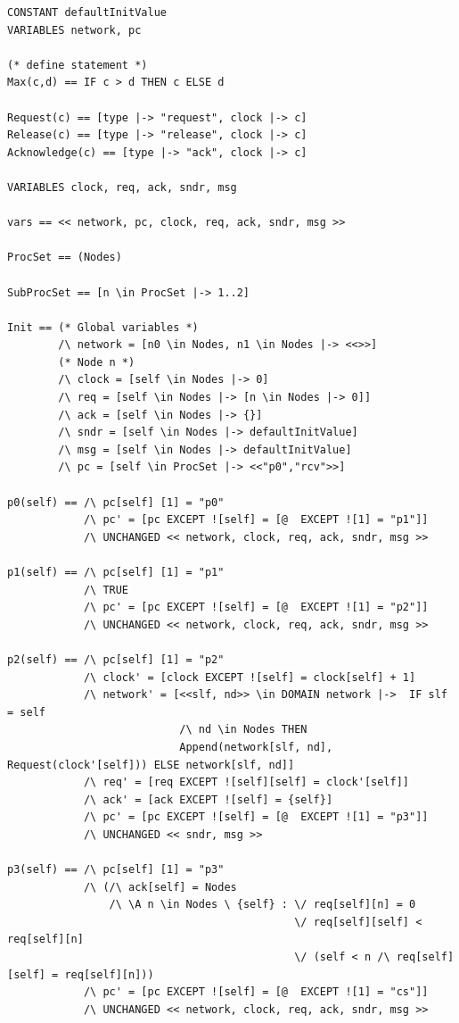 \documentclass{thesul}
\newcommand{\tlaplus}{TLA\textsuperscript{+}\xspace}
\begin{document}
\begin{appendices}
\begin{lstlisting}[caption = \tlaplus translation for Sub-Processes, frame = tlrb, firstnumber = 1]
CONSTANT defaultInitValue
VARIABLES network, pc

(* define statement *)
Max(c,d) == IF c > d THEN c ELSE d

Request(c) == [type |-> "request", clock |-> c]
Release(c) == [type |-> "release", clock |-> c]
Acknowledge(c) == [type |-> "ack", clock |-> c]

VARIABLES clock, req, ack, sndr, msg

vars == << network, pc, clock, req, ack, sndr, msg >>

ProcSet == (Nodes)

SubProcSet == [n \in ProcSet |-> 1..2]

Init == (* Global variables *)
        /\ network = [n0 \in Nodes, n1 \in Nodes |-> <<>>]
        (* Node n *)
        /\ clock = [self \in Nodes |-> 0]
        /\ req = [self \in Nodes |-> [n \in Nodes |-> 0]]
        /\ ack = [self \in Nodes |-> {}]
        /\ sndr = [self \in Nodes |-> defaultInitValue]
        /\ msg = [self \in Nodes |-> defaultInitValue]
        /\ pc = [self \in ProcSet |-> <<"p0","rcv">>]

p0(self) == /\ pc[self] [1] = "p0"
            /\ pc' = [pc EXCEPT ![self] = [@  EXCEPT ![1] = "p1"]]
            /\ UNCHANGED << network, clock, req, ack, sndr, msg >>

p1(self) == /\ pc[self] [1] = "p1"
            /\ TRUE
            /\ pc' = [pc EXCEPT ![self] = [@  EXCEPT ![1] = "p2"]]
            /\ UNCHANGED << network, clock, req, ack, sndr, msg >>

p2(self) == /\ pc[self] [1] = "p2"
            /\ clock' = [clock EXCEPT ![self] = clock[self] + 1]
            /\ network' = [<<slf, nd>> \in DOMAIN network |->  IF slf = self 
                           /\ nd \in Nodes THEN 
                           Append(network[slf, nd], Request(clock'[self])) ELSE network[slf, nd]]
            /\ req' = [req EXCEPT ![self][self] = clock'[self]]
            /\ ack' = [ack EXCEPT ![self] = {self}]
            /\ pc' = [pc EXCEPT ![self] = [@  EXCEPT ![1] = "p3"]]
            /\ UNCHANGED << sndr, msg >>

p3(self) == /\ pc[self] [1] = "p3"
            /\ (/\ ack[self] = Nodes
                /\ \A n \in Nodes \ {self} : \/ req[self][n] = 0
                                             \/ req[self][self] < req[self][n]
                                             \/ (self < n /\ req[self][self] = req[self][n]))
            /\ pc' = [pc EXCEPT ![self] = [@  EXCEPT ![1] = "cs"]]
            /\ UNCHANGED << network, clock, req, ack, sndr, msg >>


\end{lstlisting}
\end{appendices}
\end{document}
